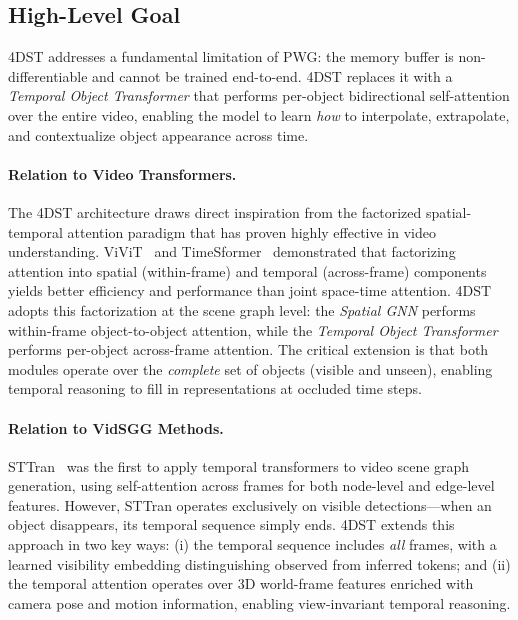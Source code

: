 \documentclass[runningheads]{llncs}
\begin{document}
\subsection{High-Level Goal}

4DST addresses a fundamental limitation of PWG: the memory buffer is non-differentiable and cannot be trained end-to-end.  4DST replaces it with a \emph{Temporal Object Transformer} that performs per-object bidirectional self-attention over the entire video, enabling the model to learn \emph{how} to interpolate, extrapolate, and contextualize object appearance across time.

\paragraph{Relation to Video Transformers.}  The 4DST architecture draws direct inspiration from the factorized spatial-temporal attention paradigm that has proven highly effective in video understanding.  ViViT~\cite{arnab2021vivit} and TimeSformer~\cite{bertasius2021space} demonstrated that factorizing attention into spatial (within-frame) and temporal (across-frame) components yields better efficiency and performance than joint space-time attention.  4DST adopts this factorization at the scene graph level: the \emph{Spatial GNN} performs within-frame object-to-object attention, while the \emph{Temporal Object Transformer} performs per-object across-frame attention.  The critical extension is that both modules operate over the \emph{complete} set of objects (visible and unseen), enabling temporal reasoning to fill in representations at occluded time steps.

\paragraph{Relation to VidSGG Methods.}  STTran~\cite{cong2021spatial} was the first to apply temporal transformers to video scene graph generation, using self-attention across frames for both node-level and edge-level features.  However, STTran operates exclusively on visible detections---when an object disappears, its temporal sequence simply ends.  4DST extends this approach in two key ways: (i) the temporal sequence includes \emph{all} frames, with a learned visibility embedding distinguishing observed from inferred tokens; and (ii) the temporal attention operates over 3D world-frame features enriched with camera pose and motion information, enabling view-invariant temporal reasoning.
\end{document}
